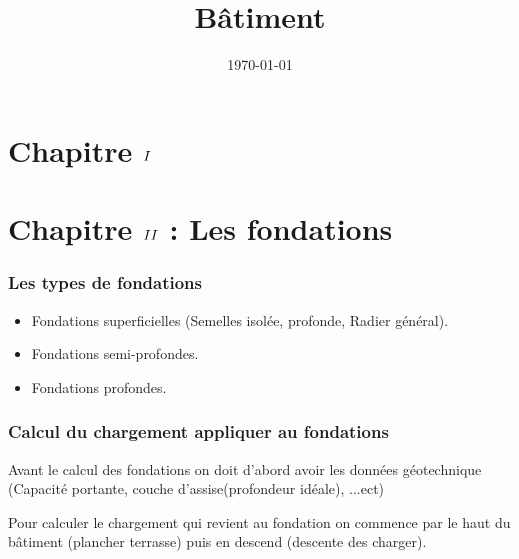 \documentclass[12pt,a4paper]{article}
\title{B\^{a}timent}
\author{}
\date{\today}
\newcommand{\RomanNum}[1] %
{\MakeUppercase{\romannumeral #1}}
\begin{document}
	
	\maketitle
	\tableofcontents
	
	\newpage
	
	\part{Chapitre $\RomanNum{1}$}
	
	\part{Chapitre $\RomanNum{2}$ : Les fondations}
	
	
	
	
	\section{Les types de fondations}
	
	\begin{itemize}
		\item Fondations superficielles (Semelles isolée, profonde, Radier général).
		\item Fondations semi-profondes.
		\item Fondations profondes.
	\end{itemize}
	
	
	\section{Calcul du chargement appliquer au fondations}
	
	Avant le calcul des fondations on doit d'abord avoir les données géotechnique (Capacité portante, couche d'assise(profondeur idéale), ...ect)
	
	\vspace{\baselineskip}
	
	Pour calculer le chargement qui revient au fondation on commence par le haut du bâtiment (plancher terrasse) puis en descend (descente des charger).
	
\end{document}
